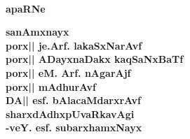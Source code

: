 
~
\medskip

\vfill

\begin{center}
{\Large\bfseries apaRNe}
\end{center}
\bigskip

\begin{center}
{\bf sanAmxnayx\\
porx|| je.Arf. lakaSxNarAvf\\[4pt]
porx|| ADayxnaDakx kaqSaNxBaTf\\[4pt]
porx|| eM. Arf. nAgarAjf\\[4pt]
porx|| mAdhurAvf\\[4pt]
DA|| esf. bAlacaMdarxrAvf\\[0.6cm]
sharxdAdhxpUvaRkavAgi\\
\hfill{-veY. esf. subarxhamxNayx}}                                                   
\end{center}

\vfill
\eject

